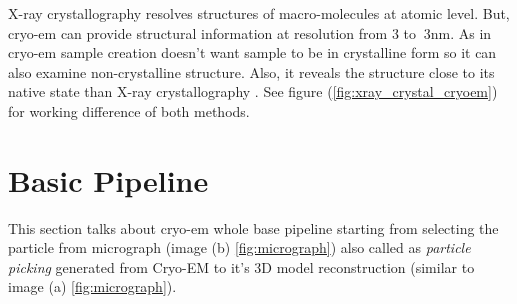 \documentclass{report}
\begin{document}
\noindent
X-ray crystallography resolves structures of macro-molecules at atomic level. But, cryo-em can provide structural information at resolution from 3\text{\AA} to $~$3nm. As in cryo-em sample creation doesn't want sample to be in crystalline form so it can also examine non-crystalline structure. Also, it reveals the structure  close to its native state than X-ray crystallography \cite{wang2017cryo_crystal}. See figure (\ref{fig:xray_crystal_cryoem}) for working difference of both methods.

\section{Basic Pipeline}\label{sec: basic_pipeline}
This section talks about cryo-em whole base pipeline starting from selecting the particle from micrograph (image (b) \ref{fig:micrograph}) also called as \textit{particle picking} generated from Cryo-EM to it's 3D model reconstruction (similar to image (a) \ref{fig:micrograph}). 
\end{document}
